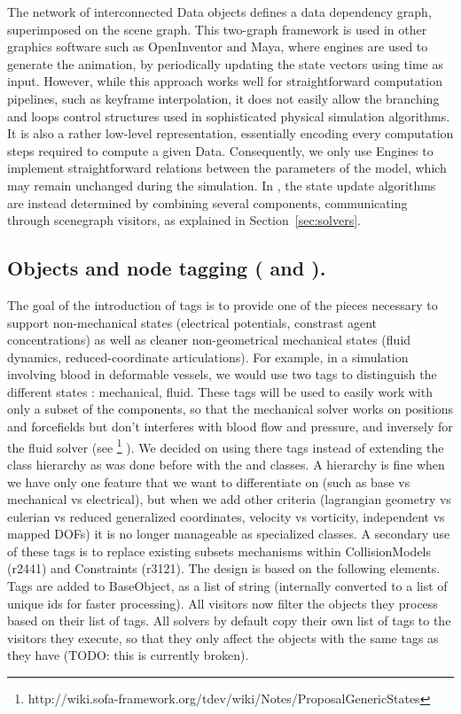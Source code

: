 The network of interconnected Data objects defines a data dependency graph, superimposed on the scene graph.
This two-graph framework is used in other graphics software such as OpenInventor and Maya, where engines are used to generate the animation, by periodically updating the state vectors using time as input. 
However, while this approach works well for straightforward computation pipelines, such as keyframe interpolation, it does not easily allow the branching and loops control structures used in sophisticated physical simulation algorithms.
It is also a rather low-level representation, essentially encoding every computation steps required to compute a given Data.
Consequently, we only use Engines to implement straightforward relations between the parameters of the model, which may remain unchanged during the simulation.
In \sofa{}, the state update algorithms are instead determined by combining several components, communicating through scenegraph visitors, as explained in Section~\ref{sec:solvers}.

\subsection*{Objects and node tagging ( and ).}

The goal of the introduction of tags is to provide one of the pieces necessary to support non-mechanical states (electrical potentials, constrast agent concentrations) as well as cleaner non-geometrical mechanical states (fluid dynamics, reduced-coordinate articulations).
For example, in a simulation involving blood in deformable vessels, we would use two tags to distinguish the different states : mechanical, fluid.
These tags will be used to easily work with only a subset of the components, so that the mechanical solver works on positions and forcefields but don't interferes with blood flow and pressure, and inversely for the fluid solver (see \footnote{http://wiki.sofa-framework.org/tdev/wiki/Notes/ProposalGenericStates} ).
We decided on using there tags instead of extending the class hierarchy as was done before with the  and  classes.
A hierarchy is fine when we have only one feature that we want to differentiate on (such as base vs mechanical vs electrical), but when we add other criteria (lagrangian geometry vs eulerian vs reduced generalized coordinates, velocity vs vorticity, independent vs mapped DOFs) it is no longer manageable as specialized classes.
A secondary use of these tags is to replace existing subsets mechanisms within CollisionModels (r2441) and Constraints (r3121).
The design is based on the following elements.
Tags are added to BaseObject, as a list of string (internally converted to a list of unique ids for faster processing).
All visitors now filter the objects they process based on their list of tags.
All solvers by default copy their own list of tags to the visitors they execute, so that they only affect the objects with the same tags as they have (TODO: this is currently broken). 
